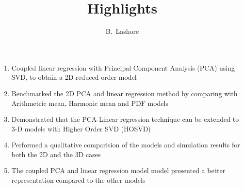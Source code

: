 \documentclass[a4paper,11pt]{article}
\author{B.~Lashore}
\title{Highlights}
\begin{document}
\maketitle

\begin{enumerate}
  \item Coupled linear regression with Principal Component Analysis (PCA) using SVD, to obtain a 2D reduced order model
  \item Benchmarked the 2D PCA and linear regression method by comparing with Arithmetric mean, Harmonic mean and PDF models
  \item Demonstrated that the PCA-Linear regression technique can be extended to 3-D models with Higher Order SVD (HOSVD)
  \item Performed a qualitative comparision of the models and simulation results for both the 2D and the 3D cases
  \item The coupled PCA and linear regression model model presented a better representation compared to the other models
\end{enumerate}
\end{document}

